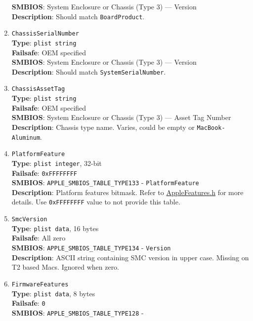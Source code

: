\documentclass[]{article}
\begin{document}
\begin{enumerate}
  \textbf{SMBIOS}: System Enclosure or Chassis (Type 3) --- Version\\
  \textbf{Description}: Should match \texttt{BoardProduct}.
\item
  \texttt{ChassisSerialNumber}\\
  \textbf{Type}: \texttt{plist\ string}\\
  \textbf{Failsafe}: OEM specified\\
  \textbf{SMBIOS}: System Enclosure or Chassis (Type 3) --- Version\\
  \textbf{Description}: Should match \texttt{SystemSerialNumber}.
\item
  \texttt{ChassisAssetTag}\\
  \textbf{Type}: \texttt{plist\ string}\\
  \textbf{Failsafe}: OEM specified\\
  \textbf{SMBIOS}: System Enclosure or Chassis (Type 3) --- Asset Tag
  Number\\
  \textbf{Description}: Chassis type name. Varies, could be empty or
  \texttt{MacBook-Aluminum}.
\item
  \texttt{PlatformFeature}\\
  \textbf{Type}: \texttt{plist\ integer}, 32-bit\\
  \textbf{Failsafe}: \texttt{0xFFFFFFFF}\\
  \textbf{SMBIOS}: \texttt{APPLE\_SMBIOS\_TABLE\_TYPE133} -
  \texttt{PlatformFeature}\\
  \textbf{Description}: Platform features bitmask. Refer to
  \href{https://github.com/acidanthera/EfiPkg/blob/master/Include/IndustryStandard/AppleFeatures.h}{AppleFeatures.h}
  for more details. Use \texttt{0xFFFFFFFF} value to not provide this table.
\item
  \texttt{SmcVersion}\\
  \textbf{Type}: \texttt{plist\ data}, 16 bytes\\
  \textbf{Failsafe}: All zero\\
  \textbf{SMBIOS}: \texttt{APPLE\_SMBIOS\_TABLE\_TYPE134} - \texttt{Version}\\
  \textbf{Description}: ASCII string containing SMC version in upper case.
  Missing on T2 based Macs. Ignored when zero.
\item
  \texttt{FirmwareFeatures}\\
  \textbf{Type}: \texttt{plist\ data}, 8 bytes\\
  \textbf{Failsafe}: \texttt{0}\\
  \textbf{SMBIOS}: \texttt{APPLE\_SMBIOS\_TABLE\_TYPE128} -

\end{enumerate}
\end{document}

